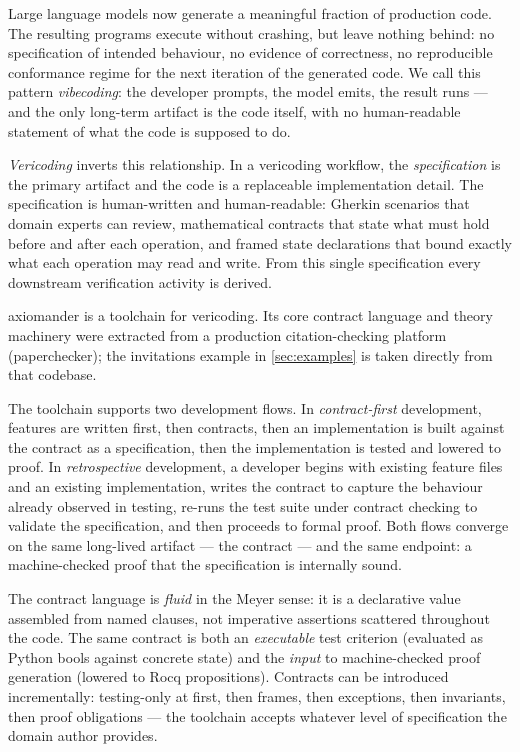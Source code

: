\documentclass[11pt,a4paper]{article}
\begin{document}
Large language models now generate a meaningful fraction of production
code.  The resulting programs execute without crashing, but leave
nothing behind: no
specification of intended behaviour, no evidence of correctness, no
reproducible conformance regime for the next iteration of the
generated code.  We call this pattern \emph{vibecoding}: the developer
prompts, the model emits, the result runs --- and the only long-term
artifact is the code itself, with no human-readable statement of what
the code is supposed to do.

\emph{Vericoding} inverts this relationship.  In a vericoding
workflow, the \emph{specification} is the primary artifact and the
code is a replaceable implementation detail.  The specification is
human-written and human-readable: Gherkin scenarios that domain
experts can review, mathematical contracts that state what must hold
before and after each operation, and framed state declarations that
bound exactly what each operation may read and write.  From this
single specification every downstream verification activity is derived.

\textsf{axiomander} is a toolchain for vericoding.  Its core
contract language and theory machinery were extracted from a
production citation-checking platform (paperchecker); the invitations
example in \cref{sec:examples} is taken directly from that
 codebase.

The toolchain supports two development flows.  In
\emph{contract-first} development, features are written first, then
contracts, then an implementation is built against the contract as a
specification, then the implementation is tested and lowered to proof.
In \emph{retrospective} development, a developer begins with existing
feature files and an existing implementation, writes the contract to
capture the behaviour already observed in testing, re-runs the test
suite under contract checking to validate the specification, and then
proceeds to formal proof.  Both flows converge on the same long-lived
artifact --- the contract --- and the same endpoint: a machine-checked
proof that the specification is internally sound.

The contract language is \emph{fluid} in the Meyer sense: it is a
declarative value assembled from named clauses, not imperative
assertions scattered throughout the code.  The same
contract is both an \emph{executable} test criterion (evaluated as
Python bools against concrete state) and the \emph{input} to
machine-checked proof generation (lowered to Rocq propositions).
Contracts can be introduced incrementally: testing-only at first, then
frames, then exceptions, then invariants, then proof obligations ---
the toolchain accepts whatever level of specification the domain author
provides.
\end{document}
